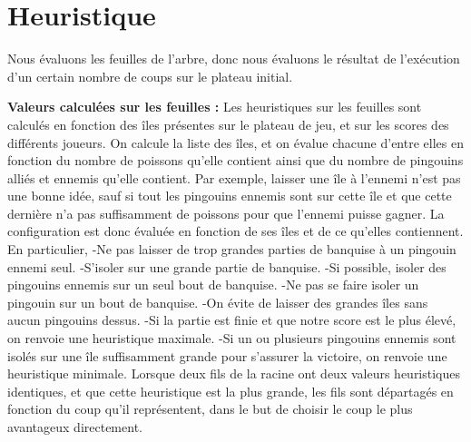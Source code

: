 \documentclass{report}
\begin{document}
\section{Heuristique}
Nous évaluons les feuilles de l'arbre, donc nous évaluons le résultat de l'exécution d'un certain nombre de coups sur le plateau initial.
\newline

\vspace{0.3cm}
\textbf{Valeurs calculées sur les feuilles :}
\newline
Les heuristiques sur les feuilles sont calculés en fonction des îles présentes sur le plateau de jeu, et sur les scores des différents joueurs.
\newline
On calcule la liste des îles, et on évalue chacune d'entre elles en fonction du nombre de poissons qu'elle contient ainsi que du nombre de pingouins alliés et ennemis qu'elle contient.
\newline
Par exemple, laisser une île à l'ennemi n'est pas une bonne idée, sauf si tout les pingouins ennemis sont sur cette île et que cette dernière n'a pas suffisamment de poissons pour que l'ennemi puisse gagner.
\newline 
La configuration est donc évaluée en fonction de ses îles et de ce qu'elles contiennent.
\newline 
En particulier,
\newline
-Ne pas laisser de trop grandes parties de banquise à un pingouin ennemi seul.
\newline
-S'isoler sur une grande partie de banquise. 
\newline
-Si possible, isoler des pingouins ennemis sur un seul bout de banquise.
\newline
-Ne pas se faire isoler un pingouin sur un bout de banquise.
\newline
-On évite de laisser des grandes îles sans aucun pingouins dessus. 
\newline
-Si la partie est finie et que notre score est le plus élevé, on renvoie une heuristique maximale.
\newline
-Si un ou plusieurs pingouins ennemis sont isolés sur une île suffisamment grande pour s'assurer la victoire, on renvoie une heuristique minimale.
\newline
\newline
Lorsque deux fils de la racine ont deux valeurs heuristiques identiques, et que cette heuristique est la plus grande, les fils sont départagés en fonction du coup qu'il représentent, dans le but de choisir le coup le plus avantageux directement. 
\vspace{0.3cm}
\end{document}
